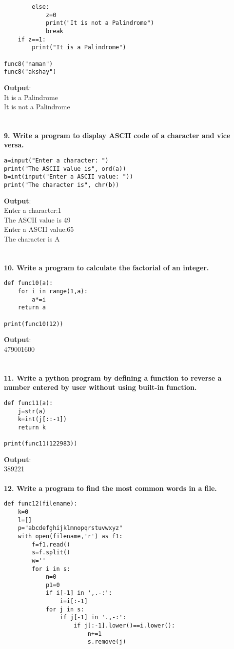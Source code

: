 \documentclass[
a4paper]{article}
\begin{document}
\begin{large}
\begin{verbatim}
        else:
            z=0
            print("It is not a Palindrome")
            break
    if z==1:
        print("It is a Palindrome")

func8("naman")
func8("akshay")
\end{verbatim}
\textbf{Output}:\\
It is a Palindrome\\
It is not a Palindrome\\
\\
\\\textbf{9. Write a program to display ASCII code of a character and vice versa.}
\begin{verbatim}
a=input("Enter a character: ")
print("The ASCII value is", ord(a)) 
b=int(input("Enter a ASCII value: "))
print("The character is", chr(b))
\end{verbatim}
\textbf{Output}:\\
Enter a character:1\\
The ASCII value is 49\\
Enter a ASCII value:65\\
The character is A\\
\\
\\\textbf{10. Write a program to calculate the factorial of an integer.}
\begin{verbatim}
def func10(a):
    for i in range(1,a):
        a*=i
    return a

print(func10(12))
\end{verbatim}
\textbf{Output}:\\
479001600\\
\\
\ \textbf{\\11. Write a python program by defining a function to reverse a number entered by
user without using built-in function.}
\begin{verbatim}
def func11(a):
    j=str(a)
    k=int(j[::-1])
    return k

print(func11(122983))
\end{verbatim}
\textbf{Output}:\\
389221\\
\\\textbf{12. Write a program to find the most common words in a file.}
\begin{verbatim}
def func12(filename):
    k=0
    l=[]
    p="abcdefghijklmnopqrstuvwxyz"
    with open(filename,'r') as f1:
        f=f1.read()
        s=f.split()
        w=''
        for i in s:
            n=0
            p1=0
            if i[-1] in ',.-:':
                i=i[:-1]
            for j in s:
                if j[-1] in '.,-:':
                    if j[:-1].lower()==i.lower():
                        n+=1
                        s.remove(j)
                        

\end{verbatim}
\end{large}
\end{document}
